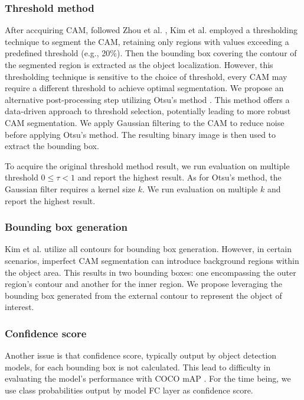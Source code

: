 \documentclass[conference]{IEEEtran}
\begin{document}
\subsubsection{Threshold method}
After accquiring CAM, followed Zhou et al. \cite{zhou2015cnnlocalization}, Kim et al. employed a thresholding technique to segment the CAM, retaining only regions with values exceeding a predefined threshold (e.g., 20\%). Then the bounding box covering the contour of the segmented region is extracted as the object localization. However, this thresholding technique is sensitive to the choice of threshold, every CAM may require a different threshold to achieve optimal segmentation. We propose an alternative post-processing step utilizing Otsu's method \cite{otsu}. This method offers a data-driven approach to threshold selection, potentially leading to more robust CAM segmentation. We apply Gaussian filtering to the CAM to reduce noise before applying Otsu's method. The resulting binary image is then used to extract the bounding box.

To acquire the original threshold method \cite{zhou2015cnnlocalization} result, we run evaluation on multiple threshold $0 \leq \tau < 1$ and report the highest result. As for Otsu's method, the Gaussian filter requires a kernel size $k$. We run evaluation on multiple $k$ and report the highest result.



\subsubsection{Bounding box generation}
Kim et al. \cite{kim2022bridging} utilize all contours for bounding box generation. However, in certain scenarios, imperfect CAM segmentation can introduce background regions within the object area. This results in two bounding boxes: one encompassing the outer region's contour and another for the inner region. We propose leveraging the bounding box generated from the external contour to represent the object of interest.

\subsubsection{Confidence score}
Another issue is that confidence score, typically output by object detection models, for each bounding box is not calculated. This lead to difficulty in evaluating the model's performance with COCO mAP \cite{lin2015microsoft}. For the time being, we use class probabilities output by model FC layer as confidence score.
\end{document}
